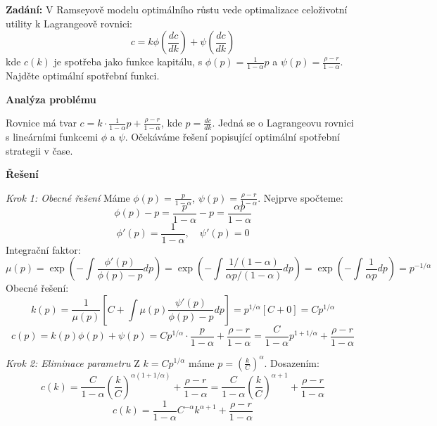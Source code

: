 \begin{example}
\label{ex:ramsey-model}

\noindent\textbf{Zadání:} V Ramseyově modelu optimálního růstu vede optimalizace celoživotní utility k Lagrangeově rovnici:
\[
c = k\phi\left(\frac{dc}{dk}\right) + \psi\left(\frac{dc}{dk}\right)
\]
kde $c(k)$ je spotřeba jako funkce kapitálu, s $\phi(p) = \frac{1}{1-\alpha}p$ a $\psi(p) = \frac{\rho - r}{1-\alpha}$. Najděte optimální spotřební funkci.

\vspace{1.5\baselineskip}

\noindent\textbf{Analýza problému}

Rovnice má tvar $c = k\cdot\frac{1}{1-\alpha}p + \frac{\rho - r}{1-\alpha}$, kde $p = \frac{dc}{dk}$. Jedná se o Lagrangeovu rovnici s lineárními funkcemi $\phi$ a $\psi$. Očekáváme řešení popisující optimální spotřební strategii v čase.

\vspace{1.5\baselineskip}

\noindent\textbf{Řešení}

\noindent\textit{Krok 1: Obecné řešení}
Máme $\phi(p) = \frac{p}{1-\alpha}$, $\psi(p) = \frac{\rho - r}{1-\alpha}$. Nejprve spočteme:
\[
\phi(p) - p = \frac{p}{1-\alpha} - p = \frac{\alpha p}{1-\alpha}
\]
\[
\phi'(p) = \frac{1}{1-\alpha}, \quad \psi'(p) = 0
\]
Integrační faktor:
\[
\mu(p) = \exp\left(-\int \frac{\phi'(p)}{\phi(p)-p} dp\right) = \exp\left(-\int \frac{1/(1-\alpha)}{\alpha p/(1-\alpha)} dp\right) = \exp\left(-\int \frac{1}{\alpha p} dp\right) = p^{-1/\alpha}
\]
Obecné řešení:
\[
k(p) = \frac{1}{\mu(p)} \left[ C + \int \mu(p) \frac{\psi'(p)}{\phi(p)-p} dp \right] = p^{1/\alpha} \left[ C + 0 \right] = Cp^{1/\alpha}
\]
\[
c(p) = k(p)\phi(p) + \psi(p) = Cp^{1/\alpha} \cdot \frac{p}{1-\alpha} + \frac{\rho - r}{1-\alpha} = \frac{C}{1-\alpha} p^{1 + 1/\alpha} + \frac{\rho - r}{1-\alpha}
\]

\vspace{1\baselineskip}

\noindent\textit{Krok 2: Eliminace parametru}
Z $k = Cp^{1/\alpha}$ máme $p = \left(\frac{k}{C}\right)^\alpha$. Dosazením:
\[
c(k) = \frac{C}{1-\alpha} \left(\frac{k}{C}\right)^{\alpha(1 + 1/\alpha)} + \frac{\rho - r}{1-\alpha} = \frac{C}{1-\alpha} \left(\frac{k}{C}\right)^{\alpha + 1} + \frac{\rho - r}{1-\alpha}
\]
\[
c(k) = \frac{1}{1-\alpha} C^{-\alpha} k^{\alpha+1} + \frac{\rho - r}{1-\alpha}
\]


\end{example}
